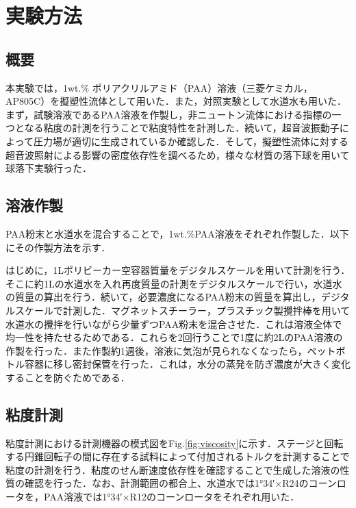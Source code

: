 \section{実験方法}
\label{sec:methods}
\subsection{概要}
本実験では，1wt.\% ポリアクリルアミド（PAA）溶液（三菱ケミカル，AP805C）を擬塑性流体として用いた．また，対照実験として水道水も用いた．まず，試験溶液であるPAA溶液を作製し，非ニュートン流体における指標の一つとなる粘度の計測を行うことで粘度特性を計測した．続いて，超音波振動子によって圧力場が適切に生成されているか確認した．そして，擬塑性流体に対する超音波照射による影響の密度依存性を調べるため，様々な材質の落下球を用いて球落下実験行った．

\subsection{溶液作製}

PAA粉末と水道水を混合することで，1wt.\%PAA溶液をそれぞれ作製した．以下にその作製方法を示す．

はじめに，1Lポリビーカー空容器質量をデジタルスケールを用いて計測を行う．そこに約1Lの水道水を入れ再度質量の計測をデジタルスケールで行い，水道水の質量の算出を行う．続いて，必要濃度になるPAA粉末の質量を算出し，デジタルスケールで計測した．マグネットスチーラー，プラスチック製攪拌棒を用いて水道水の攪拌を行いながら少量ずつPAA粉末を混合させた．これは溶液全体で均一性を持たせるためである．これらを2回行うことで1度に約2LのPAA溶液の作製を行った．また作製約1週後，溶液に気泡が見られなくなったら，ペットボトル容器に移し密封保管を行った．これは，水分の蒸発を防ぎ濃度が大きく変化することを防ぐためである．

\subsection{粘度計測}
粘度計測における計測機器の模式図をFig.\ref{fig:viscosity}に示す．ステージと回転する円錐回転子の間に存在する試料によって付加されるトルクを計測することで粘度の計測を行う．粘度のせん断速度依存性を確認することで生成した溶液の性質の確認を行った．なお、計測範囲の都合上、水道水では1°34′×R24のコーンロータを，PAA溶液では1°34′×R12のコーンロータをそれぞれ用いた．

